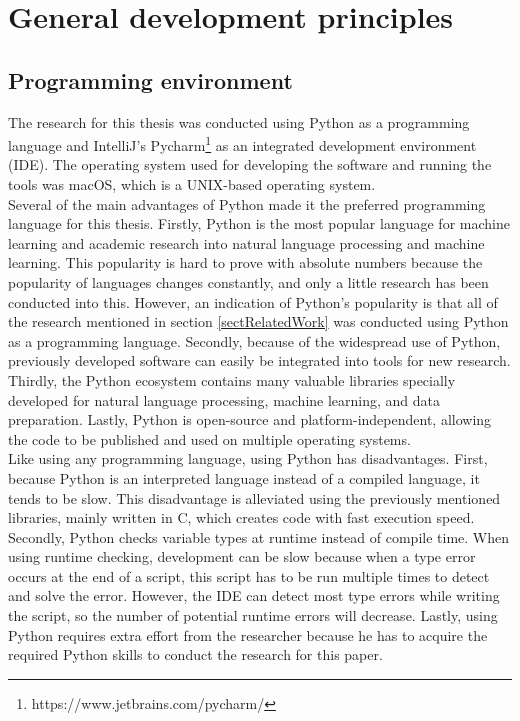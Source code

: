 \section{General development principles}
\label{secDevelopment}
\subsection{Programming environment}
\label{subsecPython}
The research for this thesis was conducted using Python as a programming language and IntelliJ's Pycharm\footnote{https://www.jetbrains.com/pycharm/} as an integrated development environment (IDE). The operating system used for developing the software and running the tools was macOS, which is a UNIX-based operating system.\\

Several of the main advantages of Python made it the preferred programming language for this thesis. Firstly, Python is the most popular language for machine learning and academic research into natural language processing and machine learning. This popularity is hard to prove with absolute numbers because the popularity of languages changes constantly, and only a little research has been conducted into this. However, an indication of Python's popularity is that all of the research mentioned in section \ref{sectRelatedWork} was conducted using Python as a programming language. Secondly, because of the widespread use of Python, previously developed software can easily be integrated into tools for new research. Thirdly,  the Python ecosystem contains many valuable libraries specially developed for natural language processing, machine learning, and data preparation. Lastly, Python is open-source and platform-independent, allowing the code to be published and used on multiple operating systems.  \\

Like using any programming language, using Python has disadvantages. First, because Python is an interpreted language instead of a compiled language, it tends to be slow. This disadvantage is alleviated using the previously mentioned libraries, mainly written in C, which creates code with fast execution speed. Secondly,  Python checks variable types at runtime instead of compile time. When using runtime checking, development can be slow because when a type error occurs at the end of a script, this script has to be run multiple times to detect and solve the error. However, the IDE can detect most type errors while writing the script, so the number of potential runtime errors will decrease. Lastly, using Python requires extra effort from the researcher because he has to acquire the required Python skills to conduct the research for this paper.\\

